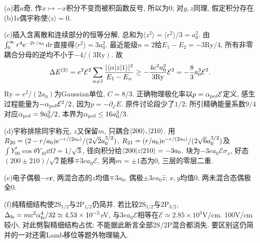 \begin{solution}
(a)若$a$奇, 作$x\mapsto-x$积分不变而被积函数反号, 所以为0; 对$y,z$同理, 假定积分存在. (b)1s偶宇称使$\langle z\rangle=0$.

(c)插入含离散和连续部分的恒等分解, 总和为$\langle z^2\rangle=\langle r^2\rangle/3=a_0^2$. 由$\int_0^\infty r^4\mathrm e^{-2r/a_0}\,\mathrm d r$直接得$\langle r^2\rangle=3a_0^2$. 最近能级$n=2$给$E_1-E_2=-3\mathrm{Ry}/4$, 所有非零耦合分母的逆均不小于$-4/(3\mathrm{Ry})$. 故
\[
\Delta E^{(2)}=e^2\mathcal E^2\sum_{\alpha\ne1}
\frac{|\langle \alpha\rvert z\lvert 1\rangle|^2}{E_1-E_\alpha}
\ge-\frac{4e^2a_0^2}{3\mathrm{Ry}}\mathcal E^2
=-\frac83a_0^3\mathcal E^2.
\]
$\mathrm{Ry}=e^2/(2a_0)$为Gaussian单位, $C=8/3$. 正确物理极化率以$p=\alpha_{\rm pol}\mathcal E$定义, 感生过程能量为$-\alpha_{\rm pol}\mathcal E^2/2$, 因为$p=-\partial_{\mathcal E}E$. 原件讨论段少了$1/2$; 所引精确能量系数$9/4$对应$\alpha_{\rm pol}=9a_0^3/2$, 本界为$\alpha_{\rm pol}\le16a_0^3/3$.

(d)宇称排除同宇称元, $z$又保留$m$, 只耦合$\lvert 200\rangle,\lvert 210\rangle$. 用$R_{20}=(2-r/a_0)\mathrm e^{-r/(2a_0)}/(2\sqrt2a_0^{3/2})$, $R_{21}=(r/a_0)\mathrm e^{-r/(2a_0)}/(2\sqrt6a_0^{3/2})$及$\int Y_{00}^*\cos\theta Y_{10}\dd\Omega=1/\sqrt3$, 径向积分给$\langle 200\rvert z\lvert 210\rangle=-3a_0$. 块为$-3ea_0\mathcal E\sigma_x$, 好态$(200\pm210)/\sqrt2$能移$\mp3ea_0\mathcal E$, 另两$m=\pm1$态为0, 三层的零层二重.

(e)电子偶极$-e\boldsymbol r$, 两混合态的$z$均值$\mp3a_0$, 偶极$\pm3ea_0\hat z$; $x,y$均值0, 两未混合态偶极全0.

(f)纯精细结构使2S$_{1/2}$与2P$_{1/2}$仍简并. 若比较2S$_{1/2}$与2P$_{3/2}$, $\Delta_{\rm fs}=mc^2\alpha_{\rm fs}^4/32\simeq4.53\times10^{-5}$eV, 与$3ea_0\mathcal E$相等在$\mathcal E\simeq2.85\times10^3$V/cm. 100V/cm较小, 对此劈裂精细结构占优; 不能据此断言全部2S/2P混合都消失. 要区别这仍简并的一对还需Lamb移位等题外物理输入.
\end{solution}

